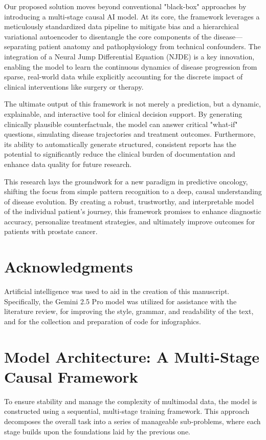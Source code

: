 \documentclass[11pt, a4paper]{article}
\begin{document}
Our proposed solution moves beyond conventional "black-box" approaches by introducing a multi-stage causal AI model. At its core, the framework leverages a meticulously standardized data pipeline to mitigate bias and a hierarchical variational autoencoder to disentangle the core components of the disease—separating patient anatomy and pathophysiology from technical confounders. The integration of a Neural Jump Differential Equation (NJDE) is a key innovation, enabling the model to learn the continuous dynamics of disease progression from sparse, real-world data while explicitly accounting for the discrete impact of clinical interventions like surgery or therapy.

The ultimate output of this framework is not merely a prediction, but a dynamic, explainable, and interactive tool for clinical decision support. By generating clinically plausible counterfactuals, the model can answer critical "what-if" questions, simulating disease trajectories and treatment outcomes. Furthermore, its ability to automatically generate structured, consistent reports has the potential to significantly reduce the clinical burden of documentation and enhance data quality for future research.

This research lays the groundwork for a new paradigm in predictive oncology, shifting the focus from simple pattern recognition to a deep, causal understanding of disease evolution. By creating a robust, trustworthy, and interpretable model of the individual patient's journey, this framework promises to enhance diagnostic accuracy, personalize treatment strategies, and ultimately improve outcomes for patients with prostate cancer.

\section*{Acknowledgments}
Artificial intelligence was used to aid in the creation of this manuscript. Specifically, the Gemini 2.5 Pro model was utilized for assistance with the literature review, for improving the style, grammar, and readability of the text, and for the collection and preparation of code for infographics.


\section{Model Architecture: A Multi-Stage Causal Framework}
To ensure stability and manage the complexity of multimodal data, the model is constructed using a sequential, multi-stage training framework. This approach decomposes the overall task into a series of manageable sub-problems, where each stage builds upon the foundations laid by the previous one.
\end{document}
